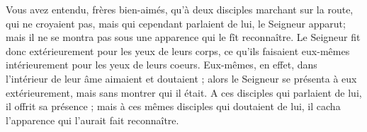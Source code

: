  Vous avez entendu, frères bien-aimés, qu’à deux disciples marchant sur la route, qui ne croyaient pas, mais qui cependant parlaient de lui, le Seigneur apparut; mais il ne se montra pas sous une apparence qui le fît reconnaître. Le Seigneur fit donc extérieurement pour les yeux de leurs corps, ce qu’ils faisaient eux-mêmes intérieurement pour les yeux de leurs coeurs. Eux-mêmes, en effet, dans l’intérieur de leur âme aimaient et doutaient ; alors le Seigneur se présenta à eux extérieurement, mais sans montrer qui il était. A ces disciples qui parlaient de lui, il offrit sa présence ; mais à ces mêmes disciples qui doutaient de lui, il cacha l’apparence qui l’aurait fait reconnaître.